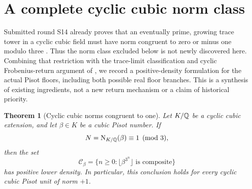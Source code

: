 \documentclass[11pt,a4paper]{article}
\newtheorem{theorem}{Theorem}[section]
\theoremstyle{remark}\newtheorem{remark}[theorem]{Remark}
\begin{document}
\section{A complete cyclic cubic norm class}
\label{rescyc:sec:cyclic}
Submitted round S14 already proves that an eventually prime,
growing trace tower in a cyclic cubic field must have norm congruent
to zero or minus one modulo three \cite[Theorem~1]{S14}. Thus the
norm class excluded below is not newly discovered here. Combining
that restriction with the trace-limit classification and cyclic
Frobenius-return argument of \cite{Keio009}, we record a
positive-density formulation for the actual Pisot floors, including
both possible real floor branches. This is a synthesis of existing
ingredients, not a new return mechanism or a claim of historical
priority.

\begin{theorem}[Cyclic cubic norms congruent to one]
\label{rescyc:thm:norm-one-mod-three}
Let $K/\mathbb Q$ be a cyclic cubic extension, and let $\beta\in K$ be a
cubic Pisot number. If
\[
 N=\operatorname{N}_{K/\mathbb Q}(\beta)\equiv1\pmod3,
\]
then the set
\[
 \mathcal C_\beta=
 \{n\ge0:\lfloor\beta^{3^n}\rfloor\text{ is composite}\}
\]
has positive lower density. In particular, this conclusion holds
for every cyclic cubic Pisot unit of norm $+1$.
\end{theorem}
\end{document}
